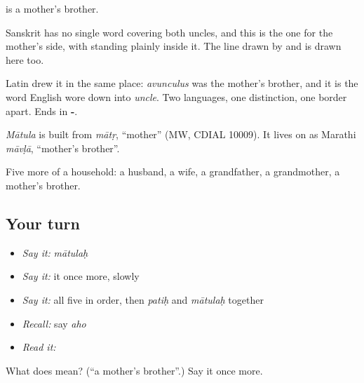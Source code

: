 \textbf{} is a mother's brother.

Sanskrit has no single word covering both uncles, and this is the one for the mother's side, with  standing plainly inside it. The line drawn by  and  is drawn here too.

Latin drew it in the same place: \emph{avunculus} was the mother's brother, and it is the word English wore down into \emph{uncle}. Two languages, one distinction, one border apart. Ends in \textbf{-}.

\begin{cousinweb}
\emph{Mātula} is built from \emph{mātṛ}, \textquotedblleft{}mother\textquotedblright{} (MW, CDIAL 10009). It lives on as Marathi \emph{māvḷā}, \textquotedblleft{}mother's brother\textquotedblright{}.
\end{cousinweb}

\begin{grammarlens}[title={What you've built}]
Five more of a household: a husband, a wife, a grandfather, a grandmother, a mother's brother.
\end{grammarlens}

\subsection*{Your turn}
\begin{itemize}
\raggedright
  \item \emph{Say it:} \emph{mātulaḥ}
  \item \emph{Say it:} it once more, slowly
  \item \emph{Say it:} all five in order, then \emph{patiḥ} and \emph{mātulaḥ} together
  \item \emph{Recall:} say \emph{aho}
  \item \emph{Read it:} \textbf{}
\end{itemize}

\begin{tcolorbox}[breakable,colback=teal!4,colframe=teal!35!black,title={Before you move on}]
What does  mean? (\textquotedblleft{}a mother's brother\textquotedblright{}.) Say it once more.
\end{tcolorbox}
